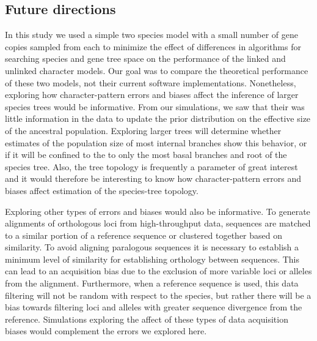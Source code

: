 

\subsection{Future directions}
In this study we used a simple two species model with a small number of gene
copies sampled from each to minimize the effect of differences in algorithms
for searching species and gene tree space on the performance of the linked and
unlinked character models.
Our goal was to compare the theoretical performance of these two models, not
their current software implementations.
Nonetheless, exploring how character-pattern errors and biases affect
the inference of larger species trees would be informative.
From our simulations, we saw that their was little information in the data to
update the prior distribution on the effective size of the ancestral population.
Exploring larger trees will determine whether estimates of the population size
of most internal branches show this behavior, or if it will be confined to the
to only the most basal branches and root of the species tree.
Also, the tree topology is frequently a parameter of great interest and
it would therefore be interesting to know how character-pattern errors and
biases affect estimation of the species-tree topology.

Exploring other types of errors and biases would also be informative.
To generate alignments of orthologous loci from high-throughput data, 
sequences are matched to a similar portion of a reference sequence or 
clustered together based on similarity. To avoid aligning paralogous sequences 
it is necessary to establish a minimum level of similarity for establishing 
orthology between sequences. This can lead to an acquisition bias due to the 
exclusion of more variable loci or alleles from the alignment.
Furthermore, when a reference 
sequence is used, this data filtering will not be random with respect to the
species, but rather there will be a bias towards filtering loci and alleles
with greater sequence divergence from the reference. 
Simulations exploring the affect of these types of data acquisition biases
would complement the errors we explored here.

